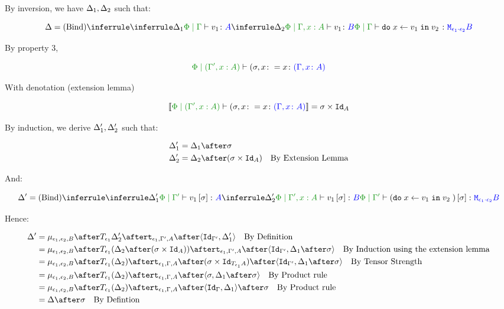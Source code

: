 {By inversion, we have $\Delta_1, \Delta_2$ such that:

\begin{equation}
    \D = \ntreeruleII{Bind}{
        \treeruleI{\D_1}{\etyperelation{\P}{\G}{v_1}{A}}
        }{
        \treeruleI{\D_2}{\etyperelation{\P}{\G, x:A }{v_1}{B}}
    }{
        \etyperelation{\P}{\G}{\doin{x}{v_1}{v_2}}{\M{\e_1\dot\e_2}{B}}
    }
\end{equation}

By property 3,

\begin{equation}
    \etyperelation{\P}{(\G', x:A)}{(\si, x\setto x}{(\gax)}
\end{equation}

With denotation (extension lemma)

\begin{equation}
    \deno{\etyperelation{\P}{(\G', x:A)}{(\si, x\setto x}{(\gax)}} = \si\times\Id{A}
\end{equation}

By induction, we derive $\Delta_1', \Delta_2'$ such that:

\begin{align}
    \D_1' & = \D_1\after \si\\
    \D_2' & = \D_2\after (\si\times\Id{A})\qt{By Extension Lemma}
\end{align}

And:

\begin{equation}
    \D' = \ntreeruleII{Bind}{
        \treeruleI{\D_1'}{\etyperelation{\P}{\G'}{v_1\ssi}{A}}
        }{
        \treeruleI{\D_2'}{\etyperelation{\P}{\G', x:A }{v_1\ssi}{B}}
    }{
        \etyperelation{\P}{\G'}{(\doin{x}{v_1}{v_2})\ssi}{\M{\e_1\dot\e_2}{B}}
    }
\end{equation}

Hence:

\begin{align}
    \D' & = \bind{\e_1}{\e_2}{B}\after\T{\e_1}{\D_2'}\after\tstrength{\e_1}{\G'}{A}\after\pr{\Id{\G'}}{\D_1'}\qt{By Definition}\\
    & = \bind{\e_1}{\e_2}{B}\after\T{\e_1}{(\D_2\after(\si\times\Id{A}))}\after\tstrength{\e_1}{\G'}{A}\after\pr{\Id{\G'}}{\D_1\after\si}\qt{By Induction using the extension lemma}\\
    & = \bind{\e_1}{\e_2}{B}\after\T{\e_1}{(\D_2)}\after\tstrength{\e_1}{\G}{A}\after(\si\times\Id{\T{\e_1}{A}})\after\pr{\Id{\G'}}{\D_1\after\si}\qt{By Tensor Strength}\\
    & = \bind{\e_1}{\e_2}{B}\after\T{\e_1}{(\D_2)}\after\tstrength{\e_1}{\G}{A}\after\pr{\si}{\D_1\after\si}\qt{By Product rule}\\
    & = \bind{\e_1}{\e_2}{B}\after\T{\e_1}{(\D_2)}\after\tstrength{\e_1}{\G}{A}\after\pr{\idg}{\D_1}\after\si\qt{By Product rule}\\
    &= \D\after\si\qt{By Defintion}\\
\end{align}

}
